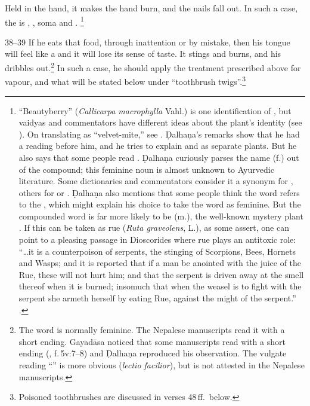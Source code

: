\begin{translation}
Held in the hand, it makes the hand burn, and the nails fall out. In such a case,
the  is , %
, %
soma and .%
\footnote{“Beautyberry” (\emph{Callicarpa macrophylla} Vahl.) is one
identification of , but vaidyas and commentators have different ideas
about the plant's identity (see \cites[410]{sing-1972}[1:
334]{avs}[\#420]{nadk-1954}).  On translating  as “velvet-mite,”
see \cite{lien-1978}. Ḍalhaṇa's remarks show that he had a reading
 before him, and he tries to explain  and  as
separate plants.  But he also says that some people read .  Ḍalhaṇa
curiously parses the name  (f.) out of the compound; this feminine noun
is almost unknown to Ayurvedic literature.  Some dictionaries and commentators
consider it a synonym for , others for  or
.  Ḍalhaṇa also mentions that some people think the word refers to
the , which might explain his choice to take the word as
feminine.  But the compounded word is far more likely to be  (m.), the
well-known mystery plant \citep[see][76--78, 125]{wuja-2003}.  If this can be
taken as rue (\emph{Ruta graveolens}, L.), as some assert, one can point to a
pleasing passage in Dioscorides where rue plays an antitoxic role: “\ldots it is a
counterpoison of serpents, the stinging of Scorpions, Bees, Hornets and Wasps; and
it is reported that if a man be anointed with the juice of the Rue, these will not
hurt him; and that the serpent is driven away at the smell thereof when it is
burned; insomuch that when the weasel is to fight with the serpent she armeth
herself by eating Rue, against the might of the serpent.” \parencites[cited 
from][262]{wren-1956}[not found in][]{osba-dios}.}
     
     \item [38--39] If he eats that food, through inattention or by mistake, then
his tongue will feel like a  and it will lose its sense
of taste. It stings and %
burns, and his \label{saliva} dribbles out.\footnote{The word
 is normally feminine.   The Nepalese manuscripts read it with a
short  ending.  Gayadāsa noticed that some manuscripts read 
with a short  ending (, f.\,5v:7--8) and
Ḍalhaṇa reproduced his observation.  The vulgate reading “” is more obvious (\emph{lectio facilior}), but is not attested in the
Nepalese manuscripts.} In such a case, he should apply the treatment prescribed
above for vapour, and what will be stated below under “toothbrush
twigs”.\footnote{Poisoned toothbrushes are discussed in verses 48\,ff.\ below.}
     

\end{translation}
